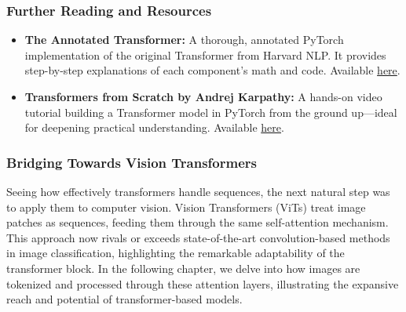 \subsubsection{Further Reading and Resources}

\begin{itemize}
    \item \textbf{The Annotated Transformer:}  
    A thorough, annotated PyTorch implementation of the original Transformer from Harvard NLP. It provides step-by-step explanations of each component’s math and code.  
    Available \href{https://nlp.seas.harvard.edu/annotated-transformer/}{here}.
    
    \item \textbf{Transformers from Scratch by Andrej Karpathy:}  
    A hands-on video tutorial building a Transformer model in PyTorch from the ground up—ideal for deepening practical understanding.  
    Available \href{https://www.youtube.com/watch?v=kCc8FmEb1nY&ab_channel=AndrejKarpathy}{here}.
\end{itemize}

\subsubsection{Bridging Towards Vision Transformers}

\noindent
Seeing how effectively transformers handle sequences, the next natural step was to apply them to computer vision. Vision Transformers (ViTs) treat image patches as sequences, feeding them through the same self-attention mechanism. This approach now rivals or exceeds state-of-the-art convolution-based methods in image classification, highlighting the remarkable adaptability of the transformer block. In the following chapter, we delve into how images are tokenized and processed through these attention layers, illustrating the expansive reach and potential of transformer-based models.








